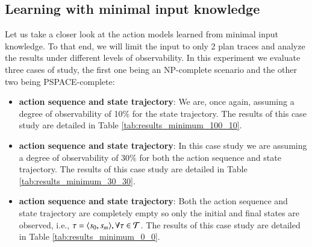 

\subsection{Learning with minimal input knowledge}
\label{minimal}
Let us take a closer look at the action models learned from minimal input knowledge. To that end, we will limit the input to only 2 plan traces and analyze the results under different levels of observability. In this experiment we evaluate three cases of study, the first one being an NP-complete scenario and the other two being PSPACE-complete:
\begin{itemize}
	\item \textbf{\FO action sequence and \PO state trajectory}: We are, once again, assuming a degree of observability of 10\% for the state trajectory. The results of this case study are detailed in Table \ref{tab:results_minimum_100_10}.
	\item  \textbf{\PO action sequence and \PO state trajectory}: In this case study we are assuming a degree of observability of 30\% for both the action sequence and state trajectory. The results of this case study are detailed in Table \ref{tab:results_minimum_30_30}.
	\item  \textbf{\NO action sequence and \NO state trajectory}: Both the action sequence and state trajectory are completely empty so only the initial and final states are observed, i.e., $\tau = {\langle s_0, s_m \rangle}, \forall \tau \in \mathcal{T}$. The results of this case study are detailed in Table \ref{tab:results_minimum_0_0}.
\end{itemize}

